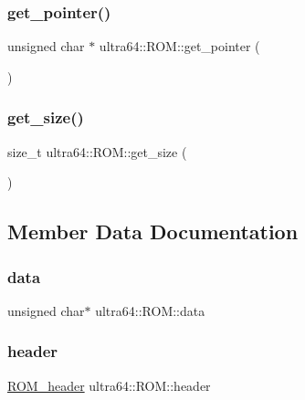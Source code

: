 \subsubsection{\texorpdfstring{get\+\_\+pointer()}{get\_pointer()}}
{\footnotesize\ttfamily unsigned char $\ast$ ultra64\+::\+R\+O\+M\+::get\+\_\+pointer (\begin{DoxyParamCaption}{ }\end{DoxyParamCaption})}

\mbox{\label{classultra64_1_1_r_o_m_af623f78ee86889c872907a0434054506}} 
\subsubsection{\texorpdfstring{get\+\_\+size()}{get\_size()}}
{\footnotesize\ttfamily size\+\_\+t ultra64\+::\+R\+O\+M\+::get\+\_\+size (\begin{DoxyParamCaption}{ }\end{DoxyParamCaption})}



\subsection{Member Data Documentation}
\mbox{\label{classultra64_1_1_r_o_m_a5853bb7a3ce6dbd099ee8477961394ec}} 
\subsubsection{\texorpdfstring{data}{data}}
{\footnotesize\ttfamily unsigned char$\ast$ ultra64\+::\+R\+O\+M\+::data\hspace{0.3cm}{\ttfamily [private]}}

\mbox{\label{classultra64_1_1_r_o_m_a3d58a7b5227748040408010bcebd1a29}} 
\subsubsection{\texorpdfstring{header}{header}}
{\footnotesize\ttfamily \hyperlink{structultra64_1_1_r_o_m__header}{R\+O\+M\+\_\+header} ultra64\+::\+R\+O\+M\+::header\hspace{0.3cm}{\ttfamily [private]}}

